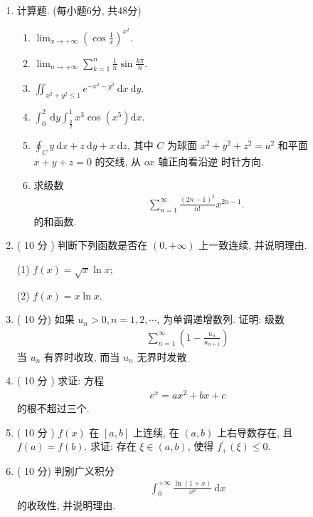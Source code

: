 \documentclass[space]{ctexart} %
\def\leq{\leqslant}
\begin{document}
\vspace*{0.5cm}
\begin{enumerate}[itemsep=1.2em,label=\arabic*.,topsep=0pt,left=0em]
\item 计算题. (每小题6分, 共48分)

\setcounter{enumii}{0}
\begin{enumerate}[itemsep=1.2em,label=(\arabic*),topsep=0pt,left=2em] %
    \item $\lim _{x \rightarrow+\infty}\left(\cos \frac{1}{x}\right)^{x^{2}} $.
    \item $\lim _{n \rightarrow+\infty} \sum_{k=1}^{n} \frac{1}{n} \sin \frac{k \pi}{n} $.
    \item $\iint_{x^{2}+y^{2} \leq 1} e^{-x^{2}-y^{2}} \mathrm{~d} x \mathrm{~d} y $.
    \item $\int_{0}^{2} \mathrm{~d} y \int_{\frac{y}{2}}^{1} x^{3} \cos \left(x^{5}\right) \mathrm{d} x $.
    \item $\oint_{C} y \mathrm{~d} x+z \mathrm{~d} y+x \mathrm{~d} z $, 其中 $ C$  为球面 $ x^{2}+y^{2}+z^{2}=a^{2} $ 和平面 $ x+y+z=0 $ 的交线, 从 $ o x $ 轴正向看沿逆 时针方向.
    \item 求级数
\begin{align*}
\sum_{n=1}^{\infty} \frac{(2 n-1)^{2}}{n !} x^{2 n-1}.
\end{align*}
的和函数.

\end{enumerate}

\item ( 10 分  )  判断下列函数是否在 $ (0,+\infty) $ 上一致连续, 并说明理由.

(1) $ f(x)=\sqrt{x} \ln x $;

(2) $ f(x)=x \ln x $.

\item ( 10 分) 如果 $ u_{n}>0, n=1,2, \cdots $, 为单调递增数列. 证明: 级数
\begin{align*}
\sum_{n=1}^{\infty}\left(1-\frac{u_{n}}{u_{n+1}}\right)
\end{align*}
当 $ u_{n} $ 有界时收玫, 而当 $ u_{n} $ 无界时发散
\item  ( 10 分  )  求证: 方程
\begin{align*}
e^{x}=a x^{2}+b x+c
\end{align*}
的根不超过三个.

\item  ( 10 分  ) $f(x)$  在 $ [a, b] $ 上连续, 在 $ (a, b) $ 上右导数存在, 且 $ f(a)=f(b) $.  求证: 存在 $ \xi \in(a, b) $, 使得  $f_{+}^{\prime}(\xi) \leq 0 $.
\item  ( 10 分) 判别广义积分
\begin{align*}
\int_{0}^{+\infty} \frac{\ln (1+x)}{x^{p}} \mathrm{~d} x
\end{align*}
的收玫性, 并说明理由.


\end{enumerate}
\end{document}
